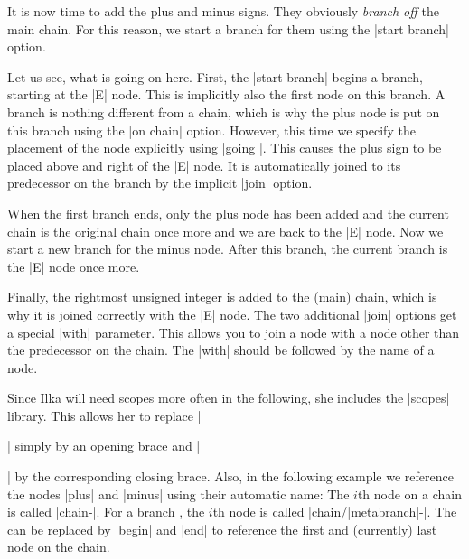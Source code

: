 It is now time to add the plus and minus signs. They obviously
\emph{branch off} the main chain. For this reason, we start a branch
for them using the |start branch| option.
\begin{codeexample}[]
\end{codeexample}

Let us see, what is going on here. First, the |start branch| begins a
branch, starting at the |E| node. This is implicitly also the first
node on this branch. A branch is nothing different from a chain, which
is why the plus node is put on this branch using the |on chain|
option. However, this time we specify the placement of the node
explicitly using |going |. This causes the plus sign
to be placed above and right of the |E| node. It is automatically
joined to its predecessor on the branch by the implicit |join|
option.

When the first branch ends, only the plus node has been added and the
current chain is the original chain once more and we are back to the
|E| node. Now we start a new branch for the minus node. After this
branch, the current branch is the |E| node once more.

Finally, the rightmost unsigned integer is added to the (main) chain,
which is why it is joined correctly with the |E| node. The two
additional |join| options get a special |with| parameter. This allows
you to join a node with a node other than the predecessor on the
chain. The  |with| should be followed by the name of a node.

Since Ilka will need scopes more often in the following, she includes
the |scopes| library. This allows her to replace |\begin{scope}|
  simply by an opening brace and  |\end{scope}| by the corresponding
closing brace. Also, in the following example we reference
the nodes |plus| and |minus| using
their automatic name: The $i$th node on a chain is called
|chain-|. For a branch , the $i$th node is called
|chain/|meta{branch}|-|. The  can be replaced by
|begin| and |end| to reference the first and (currently) last node on
the chain.

